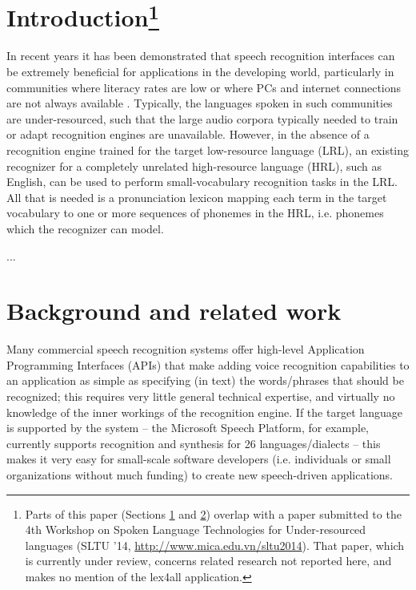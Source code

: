 \documentclass[11pt]{article}
\begin{document}
\section{Introduction\footnote{Parts of this paper (Sections \ref{sec:intro} and \ref{sec:background}) overlap with a paper submitted to the 4th Workshop on Spoken Language Technologies for Under-resourced languages (SLTU '14, \url{http://www.mica.edu.vn/sltu2014}). That paper, which is currently under review, concerns related research not reported here, and makes no mention of the lex4all application.}}
\label{sec:intro}

In recent years it has been demonstrated that speech recognition interfaces can be extremely beneficial for applications in the developing world, particularly in communities where literacy rates are low or where PCs and internet connections are not always available \cite{case4st4d,bali13,Sherwani09}. 
Typically, the languages spoken in such communities are under-resourced, such that the large audio corpora typically needed to train or adapt recognition engines are unavailable.
However, in the absence of a recognition engine trained for the target low-resource language (LRL), an existing recognizer for a completely unrelated high-resource language (HRL), such as English, can be used to perform small-vocabulary recognition tasks in the LRL. 
All that is needed is a pronunciation lexicon mapping each term in the target vocabulary to one or more sequences of phonemes in the HRL, i.e. phonemes which the recognizer can model. 

...

\section{Background and related work}
\label{sec:background}
Many commercial speech recognition systems offer high-level Application Programming Interfaces (APIs) that make adding voice recognition capabilities to an application as simple as specifying (in text) the words/phrases that should be recognized; this requires very little general technical expertise, and virtually no knowledge of the inner workings of the recognition engine. If the target language is supported by the system -- the Microsoft Speech Platform, for example, currently supports recognition and synthesis for 26 languages/dialects \cite{mspsdk} -- this makes it very easy for small-scale software developers (i.e. individuals or small organizations without much funding) to create new speech-driven applications. 
\end{document}
